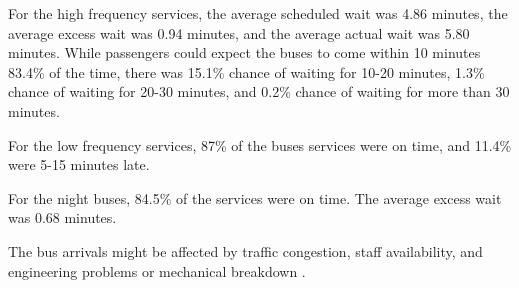\par For the high frequency services, the average scheduled wait was 4.86 minutes, the average excess wait was 0.94 minutes, and the average actual wait was 5.80 minutes. While passengers could expect the buses to come within 10 minutes 83.4\% of the time, there was 15.1\% chance of waiting for 10-20 minutes, 1.3\% chance of waiting for 20-30 minutes, and 0.2\% chance of waiting for more than 30 minutes.

\par For the low frequency services, 87\% of the buses services were on time, and 11.4\% were 5-15 minutes late.

\par For the night buses, 84.5\% of the services were on time. The average excess wait was 0.68 minutes.

\par The bus arrivals might be affected by traffic congestion, staff availability, and engineering problems or mechanical breakdown \cite{buses_performance_data}.

